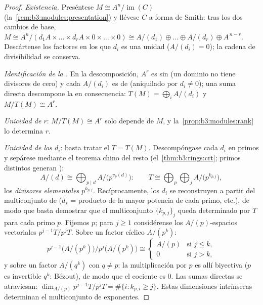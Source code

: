 \begin{proof}
\emph{Existencia.} Preséntese $M \cong A^n/\operatorname{im}(C)$
(la~\cref{rem:b3:modules:presentation}) y llévese $C$ a forma de Smith:
tras los dos cambios de base, $M \cong A^n / (d_1A \times \dots
\times d_rA \times 0 \times \dots \times 0) \cong A/(d_1) \oplus
\dots \oplus A/(d_r) \oplus A^{\,n - r}$. Descártense los factores en
los que $d_i$ es una unidad ($A/(d_i) = 0$); la cadena de divisibilidad
se conserva.

\emph{Identificación de la .} En
la descomposición, $A^r$ es sin 
(un dominio no tiene divisores de cero) y cada $A/(d_i)$ es de
 (aniquilado por $d_i \ne 0$);
una suma directa descompone la 
en consecuencia: $T(M) = \bigoplus_i A/(d_i)$ y $M/T(M) \cong A^r$.

\emph{Unicidad de $r$}: $M/T(M) \cong A^r$ solo depende de $M$, y
la~\cref{prop:b3:modules:rank} lo determina $r$.

\emph{Unicidad de los $d_i$}: basta tratar el
 $T = T(M)$.
Descompóngase cada $d_i$ en primos y sepárese mediante el teorema chino
del resto (el~\cref{thm:b3:rings:crt}; primos distintos generan
):
\[
A/(d) \cong \bigoplus_{p \mid d} A/\bigl(p^{v_p(d)}\bigr):
\qquad
T \cong \bigoplus_{p} \bigoplus_{j} A/\bigl(p^{k_{p,j}}\bigr),
\]
los \emph{divisores elementales}
$p^{k_{p,j}}$. Recíprocamente, los $d_i$ se reconstruyen a partir del
multiconjunto de  ($d_s$ = producto de la mayor potencia de cada primo,
etc.), de modo que basta demostrar que el multiconjunto $\{k_{p,j}\}_j$
queda determinado por $T$ para cada primo $p$. Fijemos $p$; para
$j \geq 1$ considérense los $A/(p)$-espacios vectoriales
$p^{j-1}T/p^jT$. Sobre un factor cíclico $A/(p^k)$:
\[
p^{j-1}\bigl(A/(p^k)\bigr)\big/p^{j}\bigl(A/(p^k)\bigr)
\cong
\begin{cases}
A/(p) & \text{si } j \leq k,\\
0 & \text{si } j > k,
\end{cases}
\]
y sobre un factor $A/(q^k)$ con $q \neq p$: la multiplicación por $p$ es
allí biyectiva ($p$ es invertible  $q^k$: Bézout), de modo que el
cociente es $0$. Las sumas directas se atraviesan: $\dim_{A/(p)}
p^{j-1}T/p^jT = \#\{i : k_{p,i} \geq j\}$. Estas dimensiones intrínsecas
determinan el multiconjunto de exponentes.
\end{proof}

